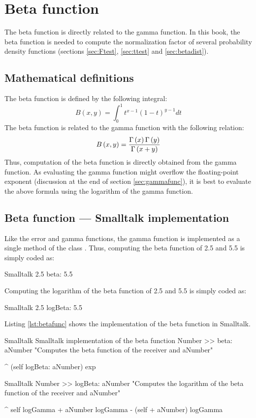 \section{Beta function}
\label{sec:betafunc} The beta function is directly related to the
gamma function. In this book, the beta function is needed to
compute the normalization factor of several probability density
functions (\cf sections \ref{sec:Ftest}, \ref{sec:ttest} and
\ref{sec:betadist}).
\subsection{Mathematical definitions}
The beta function is defined by the following integral:
\begin{equation}
\label{eq:betaint} B\left(x,y\right)=\int_0^1
t^{x-1}\left(1-t\right)^{y-1}dt
\end{equation}
The beta function is related to the gamma function with the
following relation:
\begin{equation}
B\left(x,y\right)={\Gamma\left(x\right)\Gamma\left(y\right)\over\Gamma\left(x+y\right)}
\end{equation}
Thus, computation of the beta function is directly obtained from
the gamma function.
As evaluating the gamma function might
overflow the floating-point exponent (\cf discussion at the end of
section \ref{sec:gammafunc}), it is best to evaluate the above
formula using the logarithm of the gamma function.

\subsection{Beta function --- Smalltalk implementation}
Like the error and gamma functions, the
gamma function is implemented as a single method of the class .
Thus, computing the beta function of 2.5 and 5.5 is simply coded as:
\begin{displaycode}{Smalltalk}
2.5 beta: 5.5
\end{displaycode}

Computing the logarithm of the beta function of
2.5 and 5.5 is simply coded as:
\begin{displaycode}{Smalltalk}
2.5 logBeta: 5.5
\end{displaycode}
Listing \ref{lst:betafunc} shows the implementation of the beta function in Smalltalk.

\begin{listing}[label=lst:betafunc]{Smalltalk}
  {Smalltalk implementation of the beta function}
Number >> beta: aNumber
   "Computes the beta function of the receiver and aNumber"

   ^ (self logBeta: aNumber) exp
\end{listing}

\begin{displaycode}{Smalltalk}
Number >> logBeta: aNumber
   "Computes the logarithm of the beta function of the receiver and aNumber"

   ^ self logGamma + aNumber logGamma - (self + aNumber) logGamma
\end{displaycode}

